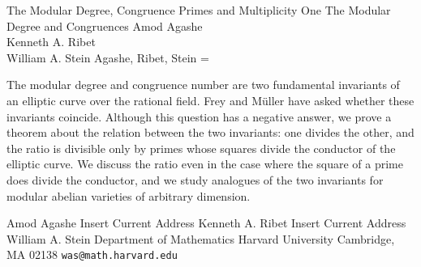 \documentclass[10pt,twoside]{article}
\theoremstyle{definition}
\def\TSkip{\bigskip}
\def\Abstract{\begingroup\narrower
    \parskip=\medskipamount\parindent=0pt{\caps Abstract. }}
\def\EndAbstract{\par\endgroup\TSkip}
\begin{document}
\Title
The Modular Degree, Congruence Primes and Multiplicity One
\ShortTitle 
The Modular Degree and Congruences
\SubTitle   
\Author 
Amod Agashe\\
Kenneth A. Ribet\\
William A. Stein
\ShortAuthor 
Agashe, Ribet, Stein
\EndTitle
\Abstract 

The modular degree and congruence number are two fundamental
invariants of an elliptic curve over the rational field.  Frey and
M{\"u}ller have asked whether these invariants coincide.  Although
this question has a negative answer, we prove a theorem about the
relation between the two invariants: one divides the other, and the
ratio is divisible only by primes whose squares divide the conductor
of the elliptic curve.  We discuss the ratio even in the case where
the square of a prime does divide the conductor, and we study
analogues of the two invariants for modular abelian varieties of
arbitrary dimension.
 


\EndAbstract
\MSC 
\EndMSC
\KEY 
\EndKEY
\Address 
\Address 
Amod Agashe
Insert Current Address
\Address
Kenneth A. Ribet
Insert Current Address
\Address
William A. Stein
Department of Mathematics
Harvard University
Cambridge, MA  02138
{\tt was@math.harvard.edu}
\EndAddress
\end{document}
